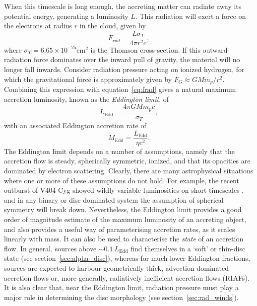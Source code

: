 When this timescale is long enough, the accreting matter
can radiate away its potential energy, generating a luminosity $L$. 
This radiation will exert a force on the electrons at radius $r$ in the cloud, 
given by
\begin{equation}
F_{rad} = \frac{L \sigma_T}{4 \pi r^2 c},
\label{eq:frad}
\end{equation} 
where $\sigma_T = 6.65\times10^{-25}$cm$^2$ is the Thomson cross-section.
If this outward radiation force dominates over the inward pull of gravity, 
the material will no longer fall inwards. Consider
radiation pressure acting on ionized hydrogen, for which the gravitational
force is approximately given by $F_G \approx G M m_p / r^2$. Combining this expression
with equation~\ref{eq:frad} gives a natural
maximum accretion luminosity, known as the {\em Eddington limit}, of
\begin{equation}
L_{\mathrm{Edd}} = \frac{4 \pi G M m_p c}{\sigma_T},
\label{eq:bondi}
\end{equation} 
with an associated Eddington accretion rate of 
\begin{equation}
\dot{M}_{\mathrm{Edd}} = \frac{L_{\mathrm{Edd}}}{\eta c^2}.
\label{eq:bondi}
\end{equation} 
The Eddington limit depends on a number of assumptions, namely
that the accretion flow is steady, spherically symmetric, ionized,
and that its opacities are dominated by electron scattering.
Clearly, there are many astrophysical situations where one or more
of these assumptions do not hold.
For example, the recent outburst of V404 Cyg showed wildly variable
luminosities on short timescales 
\citep[see, e.g.,][among many, many ATels]{kuulkers_atel2015,motta_atel2015}, 
and in any binary
or disc dominated system the assumption of spherical symmetry will
break down. Nevertheless, the Eddington limit provides a good order of magnitude 
estimate of the maximum luminosity of an accreting object,
and also provides a useful way of parameterising accretion rates,
as it scales linearly with mass. It can also be used
to characterise the {\em state} of an accretion flow.  
In general, sources above $\sim 0.1~L_{\mathrm{Edd}}$ find themselves in a 
`soft' or thin-disc state (see section~\ref{sec:alpha_disc}), 
whereas for much lower Eddington 
fractions, sources are expected to harbour geometrically thick, 
advection-dominated accretion flows
\citep[ADAFs; ][]{narayan1994,narayan1995} or, more generally, 
radiatively inefficient accretion flows (RIAFs).
It is also clear that, near the Eddington limit, radiation pressure
must play a major role in determining the disc morphology 
(see section~\ref{sec:rad_winds}).

